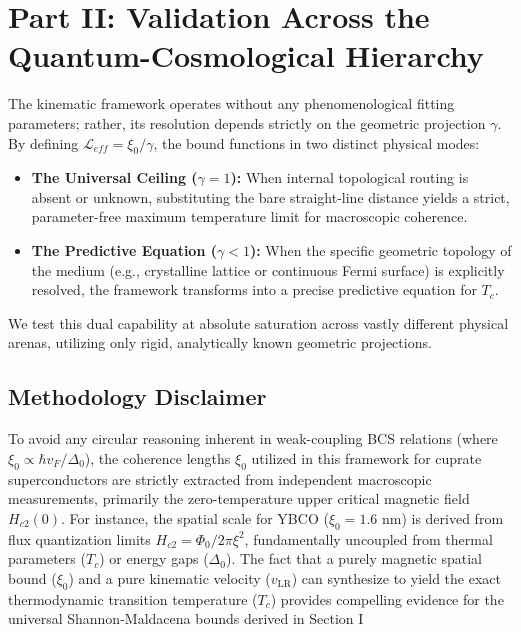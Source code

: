 \documentclass[11pt,a4paper]{article}
\begin{document}


\section*{Part II: Validation Across the Quantum-Cosmological Hierarchy}

\vspace{0.2cm}
\noindent The kinematic framework operates without any phenomenological fitting parameters; rather, its resolution depends strictly on the geometric projection $\gamma$. By defining $\mathcal{L}_{eff} = \xi_0 / \gamma$, the bound functions in two distinct physical modes:
\begin{itemize}
    \item \textbf{The Universal Ceiling ($\gamma = 1$):} When internal topological routing is absent or unknown, substituting the bare straight-line distance yields a strict, parameter-free maximum temperature limit for macroscopic coherence.
    \item \textbf{The Predictive Equation ($\gamma < 1$):} When the specific geometric topology of the medium (e.g., crystalline lattice or continuous Fermi surface) is explicitly resolved, the framework transforms into a precise predictive equation for $T_c$.
\end{itemize}
We test this dual capability at absolute saturation across vastly different physical arenas, utilizing only rigid, analytically known geometric projections.

\subsection*{Methodology Disclaimer}
To avoid any circular reasoning inherent in weak-coupling BCS relations (where $\xi_0 \propto \hbar v_F / \Delta_0$), the coherence lengths $\xi_0$ utilized in this framework for cuprate superconductors are strictly extracted from independent macroscopic measurements, primarily the zero-temperature upper critical magnetic field $H_{c2}(0)$. For instance, the spatial scale for YBCO ($\xi_0 = 1.6$ nm) is derived from flux quantization limits $H_{c2} = \Phi_0 / 2\pi\xi^2$, fundamentally uncoupled from thermal parameters ($T_c$) or energy gaps ($\Delta_0$). The fact that a purely magnetic spatial bound ($\xi_0$) and a pure kinematic velocity ($v_{\text{LR}}$) can synthesize to yield the exact thermodynamic transition temperature ($T_c$) provides compelling evidence for the universal Shannon-Maldacena bounds derived in Section I
\end{document}
